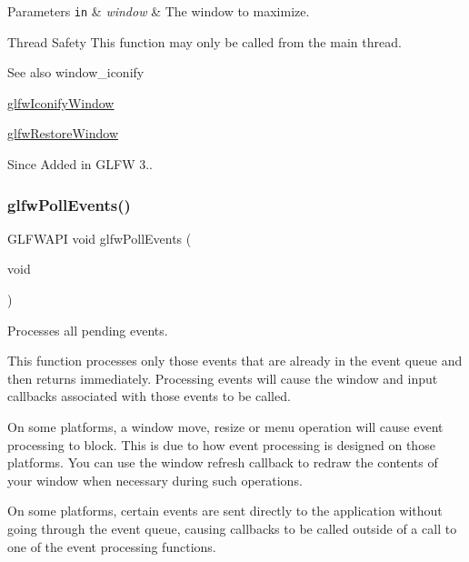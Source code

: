 \begin{DoxyParams}[1]{Parameters}
\mbox{\tt in}  & {\em window} & The window to maximize.\\
\hline
\end{DoxyParams}
\begin{DoxyParagraph}{Thread Safety}
This function may only be called from the main thread.
\end{DoxyParagraph}
\begin{DoxySeeAlso}{See also}
window\+\_\+iconify 

\hyperlink{group__window_ga24274e3c6ecd44e11fec5e6b66e4d7f3}{glfw\+Iconify\+Window} 

\hyperlink{group__window_ga1e29caf0b819f578b04db52fff17256c}{glfw\+Restore\+Window}
\end{DoxySeeAlso}
\begin{DoxySince}{Since}
Added in G\+L\+FW 3.. 
\end{DoxySince}
\mbox{\label{group__window_ga872d16e4c77f58c0436f356255920cfc}} 
\subsubsection{\texorpdfstring{glfw\+Poll\+Events()}{glfwPollEvents()}}
{\footnotesize\ttfamily G\+L\+F\+W\+A\+PI void glfw\+Poll\+Events (\begin{DoxyParamCaption}\item[{void}]{ }\end{DoxyParamCaption})}



Processes all pending events. 

This function processes only those events that are already in the event queue and then returns immediately. Processing events will cause the window and input callbacks associated with those events to be called.

On some platforms, a window move, resize or menu operation will cause event processing to block. This is due to how event processing is designed on those platforms. You can use the window refresh callback to redraw the contents of your window when necessary during such operations.

On some platforms, certain events are sent directly to the application without going through the event queue, causing callbacks to be called outside of a call to one of the event processing functions.

